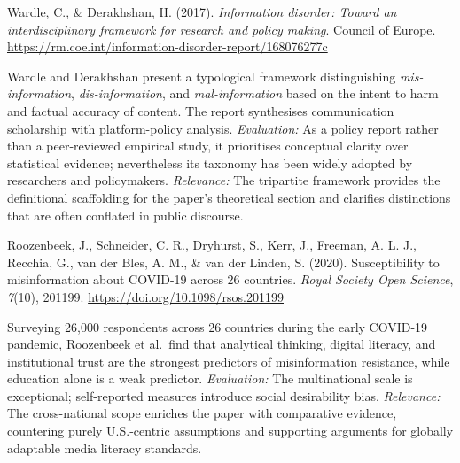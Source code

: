 \documentclass[11pt, letterpaper]{article}
\newcommand{\bibentry}[2]{%
  \begin{list}{}{%
    \setlength{\leftmargin}{0.5in}%
    \setlength{\itemindent}{-0.5in}%
    \setlength{\topsep}{6pt}%
    \setlength{\itemsep}{0pt}%
    \setlength{\parsep}{0pt}%
  }%
  \item \textcolor{neutral}{#1}%
  \end{list}%
  \vspace{4pt}%
  \begin{list}{}{%
    \setlength{\leftmargin}{0.5in}%
    \setlength{\topsep}{0pt}%
    \setlength{\itemsep}{0pt}%
    \setlength{\parsep}{0pt}%
  }%
  \item \textcolor{neutral}{#2}%
  \end{list}%
  \vspace{10pt}%
}
\begin{document}
\bibentry
  {Wardle, C., \& Derakhshan, H. (2017). \textit{Information disorder: Toward an interdisciplinary
   framework for research and policy making}. Council of Europe.
   \href{https://rm.coe.int/information-disorder-report/168076277c}{https://rm.coe.int/information-disorder-report/168076277c}}
  {Wardle and Derakhshan present a typological framework distinguishing \textit{mis-information},
   \textit{dis-information}, and \textit{mal-information} based on the intent to harm and
   factual accuracy of content. The report synthesises communication scholarship with platform-policy
   analysis. \textit{Evaluation:} As a policy report rather than a peer-reviewed empirical study,
   it prioritises conceptual clarity over statistical evidence; nevertheless its taxonomy has been
   widely adopted by researchers and policymakers. \textit{Relevance:} The tripartite framework
   provides the definitional scaffolding for the paper's theoretical section and clarifies
   distinctions that are often conflated in public discourse.}

\bibentry
  {Roozenbeek, J., Schneider, C. R., Dryhurst, S., Kerr, J., Freeman, A. L. J., Recchia, G.,
   van der Bles, A. M., \& van der Linden, S. (2020). Susceptibility to misinformation about
   COVID-19 across 26 countries. \textit{Royal Society Open Science}, \textit{7}(10), 201199.
   \href{https://doi.org/10.1098/rsos.201199}{https://doi.org/10.1098/rsos.201199}}
  {Surveying 26,000 respondents across 26 countries during the early COVID-19 pandemic,
   Roozenbeek et al.\ find that analytical thinking, digital literacy, and institutional trust
   are the strongest predictors of misinformation resistance, while education alone is a weak
   predictor. \textit{Evaluation:} The multinational scale is exceptional; self-reported measures
   introduce social desirability bias. \textit{Relevance:} The cross-national scope enriches the
   paper with comparative evidence, countering purely U.S.-centric assumptions and supporting
   arguments for globally adaptable media literacy standards.}
\end{document}
